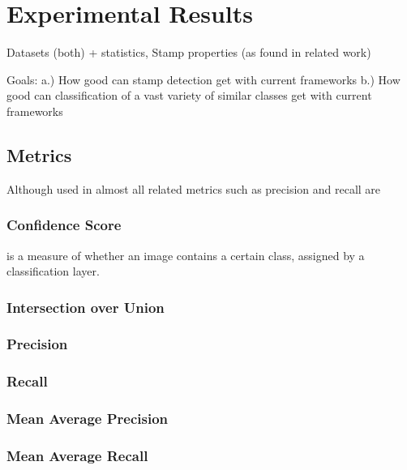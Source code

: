 \chapter{Experimental Results}
Datasets (both) + statistics, Stamp properties (as found in related work)
\blindtext[8]

Goals: 
    a.) How good can stamp detection get with current frameworks
    b.) How good can classification of a vast variety of similar classes get
        with current frameworks

\section{Metrics}
Although used in almost all related  metrics such 
as precision and recall are 
\subsection{Confidence Score} is a measure of whether an image contains a 
certain class, assigned by a classification layer. 


\subsection{Intersection over Union}

\subsection{Precision}

\subsection{Recall}

\subsection{Mean Average Precision}

\subsection{Mean Average Recall}
